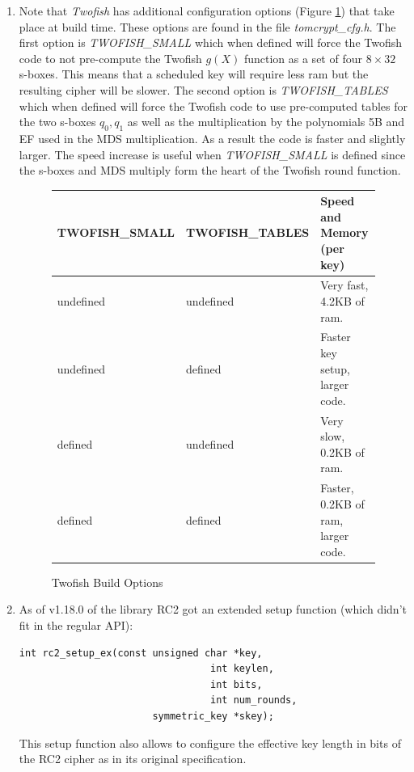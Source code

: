 \documentclass[synpaper]{book}
\begin{document}
\begin{small}
\begin{enumerate}
\item
Note that \textit{Twofish} has additional configuration options (Figure \ref{fig:twofishopts}) that take place at build time.  These options are found in
the file \textit{tomcrypt\_cfg.h}.  The first option is \textit{TWOFISH\_SMALL} which when defined will force the Twofish code
to not pre-compute the Twofish \textit{$g(X)$} function as a set of four $8 \times 32$ s-boxes.  This means that a scheduled
key will require less ram but the resulting cipher will be slower.  The second option is \textit{TWOFISH\_TABLES} which when
defined will force the Twofish code to use pre-computed tables for the two s-boxes $q_0, q_1$ as well as the multiplication
by the polynomials 5B and EF used in the MDS multiplication.  As a result the code is faster and slightly larger.  The
speed increase is useful when \textit{TWOFISH\_SMALL} is defined since the s-boxes and MDS multiply form the heart of the
Twofish round function.

\begin{figure}[hpbt]
  
\begin{small}
\begin{center}
\begin{tabular}{|l|l|l|}
\hline \textbf{TWOFISH\_SMALL} & \textbf{TWOFISH\_TABLES} & \textbf{Speed and Memory (per key)} \\
\hline undefined & undefined & Very fast, 4.2KB of ram. \\
\hline undefined & defined & Faster key setup, larger code. \\
\hline defined & undefined & Very slow, 0.2KB of ram. \\
\hline defined & defined & Faster, 0.2KB of ram, larger code. \\
\hline
\end{tabular}
\end{center}
\end{small}
\caption{Twofish Build Options}
\label{fig:twofishopts}
\end{figure}

\item
As of v1.18.0 of the library RC2 got an extended setup function (which didn't fit in the regular API):

\begin{verbatim}
int rc2_setup_ex(const unsigned char *key,
                                 int keylen,
                                 int bits,
                                 int num_rounds,
                       symmetric_key *skey);
\end{verbatim}

This setup function also allows to configure the effective key length in bits of the RC2 cipher as in its original specification.

\end{enumerate}
\end{small}
\end{document}
